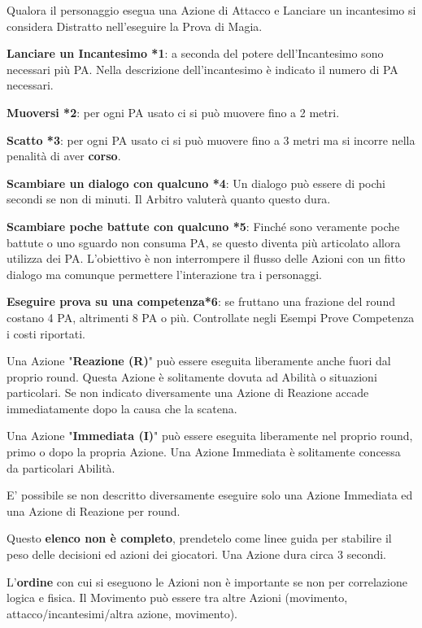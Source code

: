 \documentclass[12pt,a4paper,twoside,openany]{book}
\begin{document}
Qualora il personaggio esegua una Azione di Attacco e Lanciare un incantesimo si considera Distratto nell'eseguire la Prova di Magia.

\begin{multicols}{2}
	
\textbf{Lanciare un Incantesimo *1}: a seconda del potere dell'Incantesimo sono necessari più PA. Nella descrizione dell'incantesimo è indicato il numero di PA necessari. 

\textbf{Muoversi *2}: per ogni PA usato ci si può muovere fino a 2 metri.

\textbf{Scatto *3}: per ogni PA usato ci si può muovere fino a 3 metri ma si incorre nella penalità di aver \textbf{corso}.

\textbf{Scambiare un dialogo con qualcuno *4}: Un dialogo può essere di pochi secondi se non di minuti. Il Arbitro valuterà quanto questo dura.

\textbf{Scambiare poche battute con qualcuno *5}: Finché sono veramente poche battute o uno sguardo non consuma PA, se questo diventa più articolato allora utilizza dei PA. L'obiettivo è non interrompere il flusso delle Azioni con un fitto dialogo ma comunque permettere l'interazione tra i personaggi.

\textbf{Eseguire prova su una competenza*6}: se fruttano una frazione del round costano 4 PA, altrimenti 8 PA o più. Controllate negli Esempi Prove Competenza i costi riportati.

Una Azione "\textbf{Reazione (R)}" può essere eseguita liberamente anche fuori dal proprio round. Questa Azione è solitamente dovuta ad Abilità o situazioni particolari. Se non indicato diversamente una Azione di Reazione accade immediatamente dopo la causa che la scatena.

Una Azione "\textbf{Immediata (I)}" può essere eseguita liberamente nel proprio round, primo o dopo la propria Azione. Una Azione Immediata è solitamente concessa da particolari Abilità.

E' possibile se non descritto diversamente eseguire solo una Azione Immediata ed una Azione di Reazione per round.

\medskip

Questo \textbf{elenco non è completo}, prendetelo come linee guida per stabilire il peso delle decisioni ed azioni dei giocatori. Una Azione dura circa 3 secondi.

L'\textbf{ordine} con cui si eseguono le Azioni non è importante se non per correlazione logica e fisica. Il Movimento può essere tra altre Azioni (movimento, attacco/incantesimi/altra azione, movimento).


\end{multicols}
\end{document}
